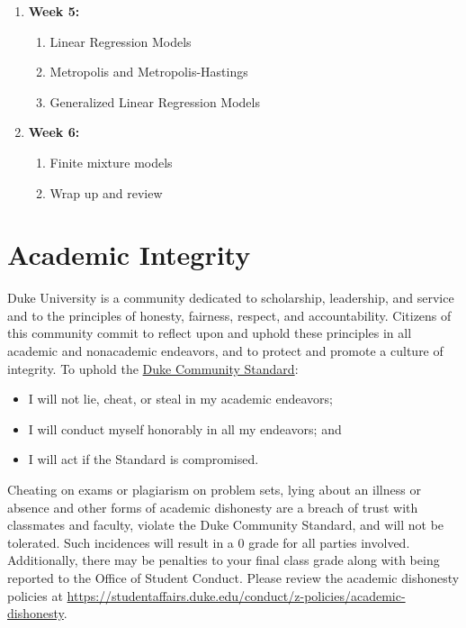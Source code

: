 \documentclass[11pt, a4paper]{article}
\begin{document}
\begin{enumerate}[label= {\color{darkblue}{\ArrowBoldRightStrobe}}]
	\item \textbf{Week 5: }
	\begin{enumerate}[label= {\color{cyan}{\Rectangle}}]
		\item Linear Regression Models
		\item Metropolis and Metropolis-Hastings
		\item Generalized Linear Regression Models
	\end{enumerate}
	\item \textbf{Week 6: }
	\begin{enumerate}[label= {\color{cyan}{\Rectangle}}]
		\item Finite mixture models
		\item Wrap up and review
	\end{enumerate}
\end{enumerate}


\section{Academic Integrity}  
Duke University is a community dedicated to scholarship, leadership, and service and to the principles of honesty, fairness, respect, and accountability. Citizens of this community commit to reflect upon and uphold these principles in all academic and nonacademic endeavors, and to protect and promote a culture of integrity. To uphold the \href{https://studentaffairs.duke.edu/conduct/about-us/duke-community-standard}{Duke Community Standard}:
\begin{itemize}[label= {\color{darkred}{\Large \HandRight}}]
	\item I will not lie, cheat, or steal in my academic endeavors;
	\item I will conduct myself honorably in all my endeavors; and
	\item I will act if the Standard is compromised.
\end{itemize}

Cheating on exams or plagiarism on problem sets, lying about an illness or absence and other forms of academic dishonesty are a breach of trust with classmates and faculty, violate the Duke Community Standard, and will not be tolerated. Such incidences will result in a 0 grade for all parties involved. Additionally, there may be penalties to your final class grade along with being reported to the Office of Student Conduct. Please review the academic dishonesty policies at \url{https://studentaffairs.duke.edu/conduct/z-policies/academic-dishonesty}.
\end{document}
